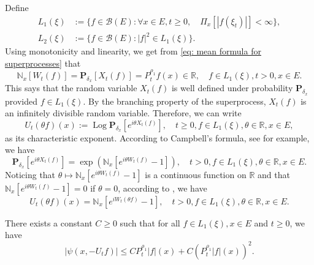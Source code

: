 \documentclass[EJP]{ejpecp} %
\begin{document}
	Define
\begin{align}
	L_1(\xi)
	&:= \{f\in \mathcal B(E): \forall x\in E, t\geq 0, \quad \Pi_x[|f(\xi_t)|]< \infty\}, \\
	L_2(\xi)
	&:= \{f \in \mathcal B(E): |f|^2 \in L_1(\xi)\}.
\end{align}
	Using monotonicity and linearity, we get from \eqref{eq: mean formula for superprocesses}  that
\[
	\mathbb N_x[W_t(f)]
	= \mathbf P_{\delta_x}[X_t(f)]
	= P^{\rho_1}_t f(x) \in \mathbb R,
	\quad f\in L_1(\xi), t > 0,x\in E.
\]
	This says that the random variable
    $X_t(f)$ is well defined
	under probability $\mathbf P_{\delta_x}$ provided $f\in L_1(\xi)$.
	By the branching property of the superprocess, $X_t(f)$ is an infinitely divisible random variable.
	Therefore, we can write
\[
	U_t(\theta f)(x)
	:= \operatorname{Log} \mathbf P_{\delta_x}[e^{i \theta X_t( f)}],
	\quad t\geq 0, f\in L_1(\xi), \theta \in \mathbb R, x\in E,
\]
	as its characteristic exponent.
	According to Campbell's formula, see \cite[Theorem 2.7]{Kyprianou2014Fluctuations} for example, we have
\[
	\mathbf P_{\delta_x} [e^{i\theta X_t(f)}]
	= \exp(\mathbb N_x[ e^{i\theta W_t(f)} - 1]),
	\quad t>0, f\in L_1(\xi), \theta \in \mathbb R, x\in E.
\]
	Noticing that $\theta \mapsto \mathbb N_x[e^{i\theta W_t(f)} - 1]$ is a continuous function on $\mathbb R$ and that $\mathbb N_x[e^{i\theta W_t(f)} - 1] = 0$ if $\theta = 0$, according to \cite[Lemma 7.6]{Sato2013Levy}, we have
\begin{equation}
\label{eq: N and characteristic exponent}
	U_t(\theta f)(x)
	= \mathbb N_x[e^{i W_t(\theta f)} - 1],	
	\quad t>0, f\in L_1(\xi), \theta \in \mathbb R, x\in E.
\end{equation}

\begin{lemma}
	There exists a constant $C\geq 0$ such that for all $f \in L_1(\xi),x\in E$ and $t\geq 0$, we have
\begin{equation}
	\label{eq: upper bound of psi(v)}
    |\psi (x,-U_tf)|
    \leq C P^{\rho_1}_t |f|(x) + C (P^{\rho_1}_t |f| (x))^2.
\end{equation}
\end{lemma}
\end{document}
